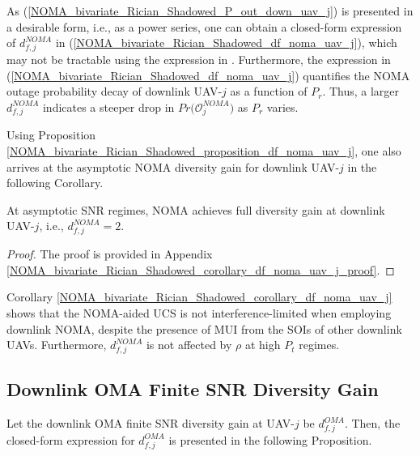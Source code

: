 As (\ref{NOMA_bivariate_Rician_Shadowed_P_out_down_uav_j}) is presented in a desirable form, i.e., as a power series, one can obtain a closed-form expression of $d_{f,j}^{NOMA}$ in (\ref{NOMA_bivariate_Rician_Shadowed_df_noma_uav_j}), which may not be tractable using the expression in \cite[eq. (48)]{lopez2018bivariate}. Furthermore, the expression in (\ref{NOMA_bivariate_Rician_Shadowed_df_noma_uav_j}) quantifies the NOMA outage probability decay of downlink UAV-$j$ as a function of $P_r$. Thus, a larger $d_{f,j}^{NOMA}$ indicates a steeper drop in $Pr\big(\mathcal{O}_{j}^{NOMA}\big)$ as $P_r$ varies. 

Using Proposition \ref{NOMA_bivariate_Rician_Shadowed_proposition_df_noma_uav_j}, one also arrives at the asymptotic NOMA diversity gain for downlink UAV-$j$ in the following Corollary.
\begin{corollary} \label{NOMA_bivariate_Rician_Shadowed_corollary_df_noma_uav_j}
At asymptotic SNR regimes, NOMA achieves full diversity gain at downlink UAV-$j$, i.e., $d_{f,j}^{NOMA}=2$.
\end{corollary}
\begin{proof}
The proof is provided in Appendix \ref{NOMA_bivariate_Rician_Shadowed_corollary_df_noma_uav_j_proof}. 
\end{proof}

Corollary \ref{NOMA_bivariate_Rician_Shadowed_corollary_df_noma_uav_j} shows that the NOMA-aided UCS is not interference-limited when employing downlink NOMA, despite the presence of MUI from the SOIs of other downlink UAVs. Furthermore, $d_{f,j}^{NOMA}$ is not affected by $\rho$ at high $P_t$ regimes.

\subsection{Downlink OMA Finite SNR Diversity Gain}

Let the downlink OMA finite SNR diversity gain at UAV-$j$ be $d_{f,j}^{OMA}$. Then, the closed-form expression for $d_{f,j}^{OMA}$ is presented in the following Proposition.

